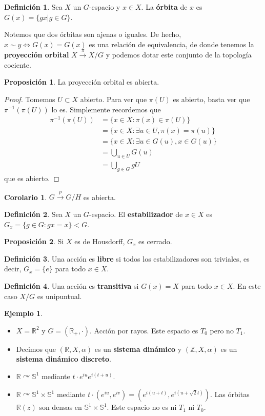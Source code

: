\documentclass[spanish]{article}
\theoremstyle{definition}
\newtheorem*{defn}{Definición}
\newtheorem*{prop}{Proposición}
\newtheorem*{coro}{Corolario}
\newtheorem*{ejem}{Ejemplo}
\newcommand{\R}{\mathbb{R}}
\newcommand{\Z}{\mathbb{Z}}
\newcommand{\SP}{\mathbb{S}}
\begin{document}
\begin{defn}
	Sea $X$ un $G$-espacio y $x\in X$. La \textbf{órbita} de $x$ es $G(x)=\{gx|g\in G\}$.
\end{defn}
Notemos que dos órbitas son ajenas o iguales. De hecho, $x\sim y\iff G(x)=G(x)$ es una relación de equivalencia, de donde tenemos la \textbf{proyección orbital} $X\xrightarrow{\pi}X/G$ y podemos dotar este conjunto de la topología cociente.
\begin{prop}
	La proyección orbital es abierta.
\end{prop}
\begin{proof}
	Tomemos $U\subset X$ abierto. Para ver que $\pi(U)$ es abierto, basta ver que $\pi^{-1}\left(\pi(U)\right)$ lo es. Simplemente recordemos que 
	\begin{align*}
		\pi^{-1}\left(\pi(U)\right)&=\{x\in X:\pi(x)\in\pi(U)\}\\
		&=\{x\in X:\exists u\in U,\pi(x)=\pi(u)\}\\
		&=\{x\in X:\exists u\in G(u),x\in G(u)\}\\
		&=\bigcup_{u\in U}G(u)\\
		&=\bigcup_{g\in G}gU
	\end{align*}
	que es abierto.
\end{proof}
\begin{coro}
	$G\xrightarrow{p} G/H$ es abierta.
\end{coro}
\begin{defn}
	Sea $X$ un $G$-espacio. El \textbf{estabilizador} de $x\in X$ es $G_x=\{g\in G:gx=x\}<G$.
\end{defn}
\begin{prop}
	Si $X$ es de Housdorff, $G_x$ es cerrado.
\end{prop}
\begin{defn}
	Una acción es \textbf{libre} si todos los estabilizadores son triviales, es decir, $G_x=\{e\}$ para todo $x\in X$.
\end{defn}
\begin{defn}
	Una acción es \textbf{transitiva} si $G(x)=X$ para todo $x\in X$. En este caso $X/G$ es unipuntual.
\end{defn}
\begin{ejem}\leavevmode
\begin{itemize}
	\item 	$X=\R^2$ y $G=(\R_+,\cdot)$. Acción por rayos. Este espacio es $T_0$ pero no $T_1$.
	\item Decimos que $(\R,X,\alpha)$ es un \textbf{sistema dinámico} y $(\Z,X,\alpha)$ es un \textbf{sistema dinámico discreto}.
	\item $\R\curvearrowright\SP^1$ mediante $t\cdot e^{iu} e^{i(t+u)}$.
	\item $\R\curvearrowright\SP^1\times\SP^1$ mediante $t\cdot(e^{iu},e^{iv})=(e^{i(u+t)},e^{i(u+\sqrt{2}t)})$. Las órbitas $\R(z)$ son densas en $\SP^1\times\SP^1$. Este espacio no es ni $T_1$ ni $T_0$.
\end{itemize}
\end{ejem}
\end{document}
